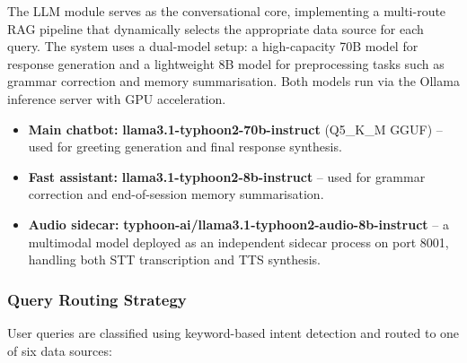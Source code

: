 The LLM module serves as the conversational core, implementing a multi-route RAG pipeline that dynamically selects the appropriate data source for each query. The system uses a dual-model setup: a high-capacity 70B model for response generation and a lightweight 8B model for preprocessing tasks such as grammar correction and memory summarisation. Both models run via the Ollama inference server with GPU acceleration.

\begin{itemize}
    \item \textbf{Main chatbot:} \textbf{llama3.1-typhoon2-70b-instruct} (Q5\_K\_M GGUF) -- used for greeting generation and final response synthesis.

    \item \textbf{Fast assistant:} \textbf{llama3.1-typhoon2-8b-instruct} -- used for grammar correction and end-of-session memory summarisation.

    \item \textbf{Audio sidecar:} \textbf{typhoon-ai/llama3.1-typhoon2-audio-8b-instruct} -- a multimodal model deployed as an independent sidecar process on port 8001, handling both STT transcription and TTS synthesis.
\end{itemize}

\subsubsection{Query Routing Strategy}

User queries are classified using keyword-based intent detection and routed to one of six data sources:

